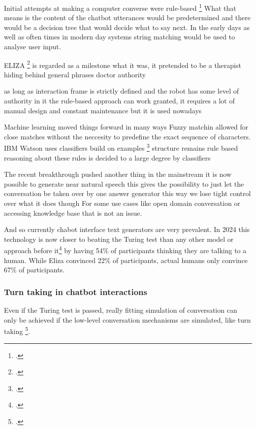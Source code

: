 \documentclass[12pt]{report}
\begin{document}
{\par
Initial attempts at making a computer converse were rule-based \footcite[p.~43]{Sacks1992}
What that means is the content of the chatbot utterances
would be predetermined
and there would be a decision tree that would decide what to say next.
In the early days as well as often times in modern day systems
string matching would be used to analyse user input.

\par
ELIZA \footcite{weizenbaum1966eliza} is regarded as a milestone
what it was, it pretended to be a therapist
hiding behind general phrases
doctor authority

as long as interaction frame is strictly defined and
the robot has some level of authority in it
the rule-based approach can work
granted, it requires a lot of manual design
and constant maintenance
but it is used nowadays

\par
Machine learning moved things forward in many ways
Fuzzy matchin allowed for close matches
without the neccesity to predefine the exact sequence of characters.
IBM Watson uses classifiers build on examples \footcite{building_watson_2010}
structure remains rule based
reasoning about these rules is decided to a large degree by classifiers

\par
The recent breakthrough pushed another thing in the mainstream
it is now possible to generate near natural speech
this gives the possibility to just let the conversation be taken over by one answer generator
this way we lose tight control over what it does though
For some use cases
like open domain conversation or accessing knowledge base
that is not an issue.

\par
And so currently chabot interface text generators are very prevalent.
In 2024 this technology is now closer to beating the Turing test than
any other model or approach before it\footcite{jones2024peopledistinguishgpt4human}
by having 54\% of participants thinking
they are talking to a human.
While Eliza convinced 22\% of participants,
actual humans only convince 67\% of participants.

\subsubsection{Turn taking in chatbot interactions}

\par
Even if the Turing test is passed,
really fitting simulation of conversation
can only be achieved if the low-level conversation mechanisms
are simulated, like turn taking \footcite{optimizing-turn-taking}.

}
\end{document}

